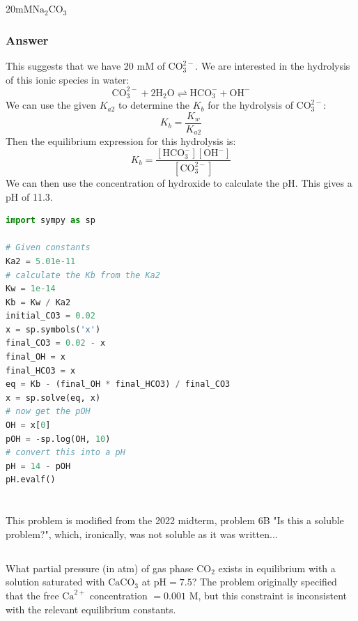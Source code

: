 \documentclass[12pt]{article}
\begin{document}
\subsection{}
$20 \mathrm{mM} \mathrm{Na}_{2} \mathrm{CO}_{3}$
\subsubsection{Answer}
This suggests that we have 20 mM of $\mathrm{CO}_{3}^{2-}$. We are interested in the hydrolysis of this ionic species in water:
\begin{equation}
\mathrm{CO}_{3}^{2-}+2 \mathrm{H}_{2} \mathrm{O} \rightleftharpoons \mathrm{HCO}_{3}^{-}+\mathrm{OH}^{-}
\end{equation}
We can use the given $K_{a2}$ to determine the $K_{b}$ for the hydrolysis of $\mathrm{CO}_{3}^{2-}$:
\begin{equation}
K_{b}=\frac{K_{w}}{K_{a2}}
\end{equation}
Then the equilibrium expression for this hydrolysis is:
\begin{equation}
K_{b}=\frac{[\mathrm{HCO}_{3}^{-}][\mathrm{OH}^{-}]}{[\mathrm{CO}_{3}^{2-}]}
\end{equation}
We can then use the concentration of hydroxide to calculate the pH.
This gives a pH of 11.3.
\begin{lstlisting}[language=Python]
import sympy as sp

# Given constants
Ka2 = 5.01e-11
# calculate the Kb from the Ka2
Kw = 1e-14
Kb = Kw / Ka2
initial_CO3 = 0.02
x = sp.symbols('x')
final_CO3 = 0.02 - x
final_OH = x
final_HCO3 = x
eq = Kb - (final_OH * final_HCO3) / final_CO3
x = sp.solve(eq, x)
# now get the pOH
OH = x[0]
pOH = -sp.log(OH, 10)
# convert this into a pH
pH = 14 - pOH
pH.evalf()
\end{lstlisting}


\section{}
This problem is modified from the 2022 midterm, problem 6B "Is this a soluble problem?", which, ironically, was not soluble as it was written...

\subsection{}
What partial pressure (in atm) of gas phase $\mathrm{CO}_{2}$ exists in equilibrium with a solution saturated with $\mathrm{CaCO}_{3}$ at $\mathrm{pH}=7.5$? The problem originally specified that the free $\mathrm{Ca}^{2+}$ concentration $=0.001$ $\mathrm{M}$, but this constraint is inconsistent with the relevant equilibrium constants.
\end{document}
